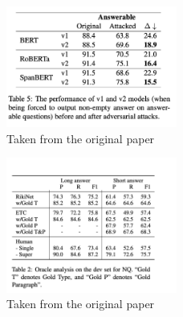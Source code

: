 \documentclass[letterpaper, 11pt]{article}
\begin{document}
\begin{figure}[H]
    \centering
    \includegraphics[width=0.5\textwidth]{figure2.png}
    \caption{Taken from the original paper \citep{impactsofunanswerable}}
    \label{fig:figure2}
\end{figure}

\begin{figure}[H]
    \centering
    \includegraphics[width=0.5\textwidth]{figure3.png}
    \caption{Taken from the original paper \citep{informationseeking}}
    \label{fig:figure3}
\end{figure}



\end{document}
